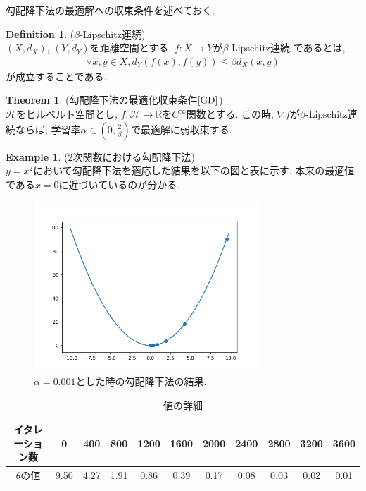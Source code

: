 \documentclass[11pt, a4paper, dvipdfmx]{jsarticle}
\theoremstyle{definition}
\newtheorem{Definition+}[Axiom+]{Definition}
\newtheorem{Theorem+}[Axiom+]{Theorem}
\newtheorem{Example+}[Axiom+]{Example}
\newcommand{\R}{\mathbb{R}}
\newcommand{\Hil}{\mathcal{H}}
\begin{document}
勾配降下法の最適解への収束条件を述べておく.
\begin{Definition+}($\beta$-Lipschitz連続)\\
    $(X, d_{X})$, $(Y, d_{Y})$を距離空間とする. $f:X\to Y$が$\beta$-Lipschitz連続
    であるとは,
    \begin{align*}
        \forall x, y\in X, d_{Y}(f(x), f(y))\leq\beta d_{X}(x, y)
    \end{align*}
    が成立することである.
\end{Definition+}
\begin{Theorem+}(勾配降下法の最適化収束条件$\cite{GD}$)\\
    $\Hil$をヒルベルト空間とし, $f:\Hil\to\R$を$C^{\infty}$関数とする. 
    この時, $\nabla f$が$\beta$-Lipschitz連続ならば, 学習率$\alpha\in\left(0, \frac{2}{\beta}\right)$で最適解に弱収束する.
\end{Theorem+}
\begin{Example+}(2次関数における勾配降下法)\\
    $y = x^2$において勾配降下法を適応した結果を以下の図と表に示す.
    本来の最適値である$x = 0$に近づいているのが分かる.
    \begin{figure}[H]
        \centering
        \includegraphics[width = 8.5cm]{Images/Gradient_Decent.png}
        \caption{$\alpha = 0.001$とした時の勾配降下法の結果.}
    \end{figure}
    \begin{table}[H]
        \centering
        \begin{tabular}{|c|c|c|c|c|c|c|c|c|c|c|}\hline
            イタレーション数 & 0 & 400 & 800 & 1200 & 1600 & 2000 & 2400 & 2800 & 3200 & 3600\\\hline
            $\theta$の値 & 9.50 & 4.27 & 1.91 & 0.86 & 0.39 & 0.17 & 0.08 & 0.03 & 0.02 & 0.01\\\hline
        \end{tabular}
        \caption{値の詳細}
    \end{table}
\end{Example+}
\end{document}
